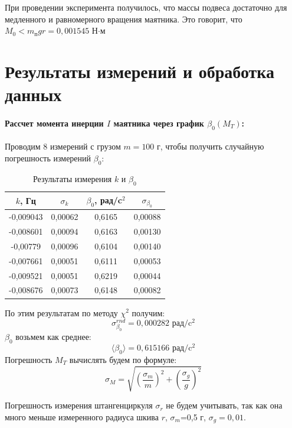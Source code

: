 \documentclass[a4paper,12pt]{article}
\begin{document}
	\noindent
	При проведении эксперимента получилось, что массы подвеса достаточно для медленного и равномерного вращения маятника. Это говорит, что $M_0<m_\text{п}gr=0,001545$ Н$\cdot$м
	
	\section{Результаты измерений и обработка данных}
	\paragraph{Рассчет момента инерции $I$ маятника через график $\beta_0(M_T)$:}
	Проводим 8 измерений с грузом $m=100$ г, чтобы получить случайную погрешность измерений $\beta_0$:
	\begin{table}[H]
		\centering
		\label{table:1}
		\caption{Результаты измерения $k$ и $\beta_0$}
		\begin{tabular}{|c|c|c|c|}
			\hline
			$k$, Гц & $\sigma_k$ &  $\beta_0$, рад/c$^2$ & $\sigma_{\beta_0}$ \\
			\hline
			-0,009043 & 0,00062 & 0,6165 & 0,00088 \\
			\hline
			-0,008601 & 0,00094 & 0,6163 & 0,00130 \\
			\hline
			-0,00779 & 0,00096 & 0,6104 & 0,00140 \\
			\hline
			-0,007661 & 0,00051 & 0,6111 & 0,00053 \\
			\hline
			-0,009521 & 0,00051 & 0,6219 & 0,00044 \\
			\hline
			-0,008676 & 0,00073 & 0,6148 & 0,00082 \\
			\hline
		\end{tabular}
	\end{table}
	\noindent
	По этим результатам по методу $\chi^2$ получим:
	\begin{equation}
		\label{eq:4}
		\sigma_{\beta_0}^{rnd}=0,000282 \text{ рад/c$^2$}
	\end{equation}
	\noindent
	$\beta_0$ возьмем как среднее:
	\begin{equation}
		\label{eq:5}
		\langle \beta_0 \rangle = 0,615166 \text{ рад/c$^2$}
	\end{equation}
	\noindent
	Погрешность $M_T$ вычислять будем по формуле:
	\begin{equation}
		\label{eq:n}
		\sigma_M=\sqrt{\left(\frac{\sigma_m}{m}\right)^2+\left(\frac{\sigma_g}{g}\right)^2}
	\end{equation}
	
	\noindent
	Погрешность измерения штангенциркуля $\sigma_r$ не будем учитывать, так как она много меньше измеренного радиуса шкива $r$, $\sigma_m$=0,5 г, $\sigma_g=0,01$.\\
\end{document}
